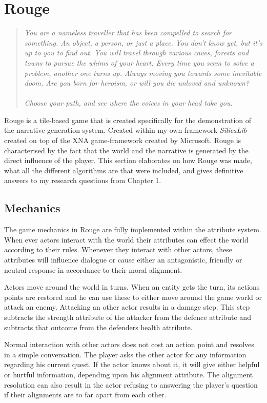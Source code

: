 \chapter{Rouge}
\label{ch:rouge}
\begin{quotation}
\textsl{You are a nameless traveller that has been compelled to search for something. An object, a person, or just a place. You don't know yet, but it's up to you to find out. You will travel through various caves, forests and towns to pursue the whims of your heart. Every time you seem to solve a problem, another one turns up. Always moving you towards some inevitable doom. Are you born for heroism, or will you die unloved and unknown? \\\\Choose your path, and see where the voices in your head take you.}
\end{quotation}
Rouge is a \rogue tile-based game that is created specifically for the demonstration of the \diage narrative generation system. Created within my own framework \textit{SilicaLib} created on top of the XNA game-framework created by Microsoft. Rouge is characterised by the fact that the world and the narrative is generated by the direct influence of the player. 
This section elaborates on how Rouge was made, what all the different algorithms are that were included, and gives definitive answers to my research questions from Chapter 1. 

\section{Mechanics}
The game mechanics in Rouge are fully implemented within the \diage attribute system. When ever actors interact with the world their attributes can effect the world according to their rules. Whenever they interact with other actors, these attributes will influence dialogue or cause either an antagonistic, friendly or neutral response in accordance to their moral alignment.

Actors move around the world in turns. When an entity gets the turn, its actions points are restored and he can use these to either move around the game world or attack an enemy. Attacking an other actor results in a damage step. This step subtracts the strength attribute of the attacker from the defence attribute and subtracts that outcome from the defenders health attribute. 

Normal interaction with other actors does not cost an action point and resolves in a simple conversation. The player asks the other actor for any information regarding his current quest. If the actor knows about it, it will give either helpful or hurtful information, depending upon his alignment attribute. The alignment resolution can also result in the actor refusing to answering the player's question if their alignments are to far apart from each other.  

